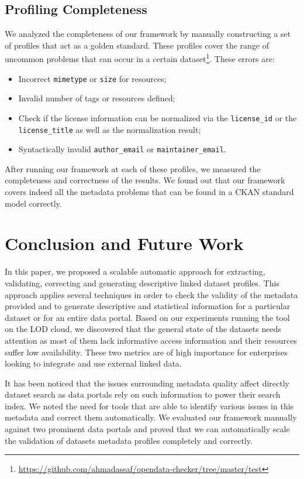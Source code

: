 \documentclass[runningheads,a4paper]{../../Util/LaTEX/llncs}
\begin{document}
\subsection{Profiling Completeness}
We analyzed the completeness of our framework by manually constructing a set of profiles that act as a golden standard. These profiles cover the range of uncommon problems that can occur in a certain dataset\footnote{\url{https://github.com/ahmadassaf/opendata-checker/tree/master/test}}. These errors are:
\begin{itemize}
 \item Incorrect \texttt{mimetype} or \texttt{size} for resources;
 \item Invalid number of tags or resources defined;
 \item Check if the license information can be normalized via the \texttt{license\_id} or the \texttt{license\_title} as well as the normalization result;
 \item Syntactically invalid \texttt{author\_email} or \texttt{maintainer\_email}.
\end{itemize}

After running our framework at each of these profiles, we measured the completeness and correctness of the results. We found out that our framework covers indeed all the metadata problems that can be found in a CKAN standard model correctly.


\section{Conclusion and Future Work}
\label{sec:conclusion}
In this paper, we proposed a scalable automatic approach for extracting, validating, correcting and generating descriptive linked dataset profiles. This approach applies several techniques in order to check the validity of the metadata provided and to generate descriptive and statistical information for a particular dataset or for an entire data portal. Based on our experiments running the tool on the LOD cloud, we discovered that the general state of the datasets needs attention as most of them lack informative access information and their resources suffer low availability. These two metrics are of high importance for enterprises looking to integrate and use external linked data.

It has been noticed that the issues surrounding metadata quality affect directly dataset search as data portals rely on such information to power their search index. We noted the need for tools that are able to identify various issues in this metadata and correct them automatically. We evaluated our framework manually against two prominent data portals and proved that we can automatically scale the validation of datasets metadata profiles completely and correctly.
\end{document}
